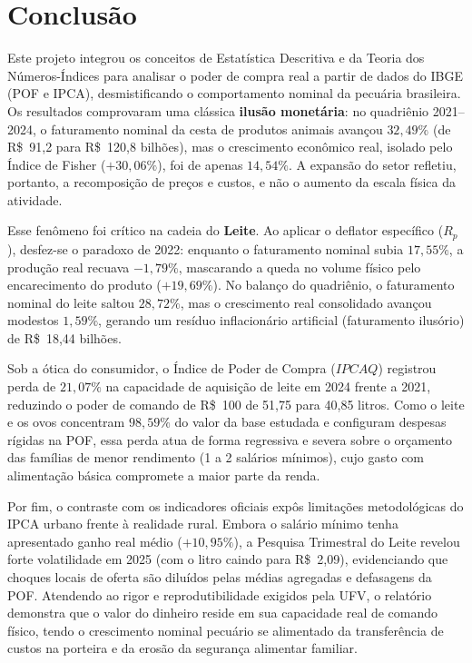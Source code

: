 \documentclass[12pt,a4paper]{article}
\begin{document}
\section*{Conclusão}

Este projeto integrou os conceitos de Estatística Descritiva e da Teoria dos Números-Índices para analisar o poder de compra real a partir de dados do IBGE (POF e IPCA), desmistificando o comportamento nominal da pecuária brasileira. Os resultados comprovaram uma clássica \textbf{ilusão monetária}: no quadriênio 2021--2024, o faturamento nominal da cesta de produtos animais avançou $32{,}49\%$ (de R\$~91,2 para R\$~120,8 bilhões), mas o crescimento econômico real, isolado pelo Índice de Fisher ($+30{,}06\%$), foi de apenas $14{,}54\%$. A expansão do setor refletiu, portanto, a recomposição de preços e custos, e não o aumento da escala física da atividade.

Esse fenômeno foi crítico na cadeia do \textbf{Leite}. Ao aplicar o deflator específico ($R_p$), desfez-se o paradoxo de 2022: enquanto o faturamento nominal subia $17{,}55\%$, a produção real recuava $-1{,}79\%$, mascarando a queda no volume físico pelo encarecimento do produto ($+19{,}69\%$). No balanço do quadriênio, o faturamento nominal do leite saltou $28{,}72\%$, mas o crescimento real consolidado avançou modestos $1{,}59\%$, gerando um resíduo inflacionário artificial (faturamento ilusório) de R\$~18,44 bilhões.

Sob a ótica do consumidor, o Índice de Poder de Compra ($IPCAQ$) registrou perda de $21{,}07\%$ na capacidade de aquisição de leite em 2024 frente a 2021, reduzindo o poder de comando de R\$~100 de 51,75 para 40,85 litros. Como o leite e os ovos concentram $98{,}59\%$ do valor da base estudada e configuram despesas rígidas na POF, essa perda atua de forma regressiva e severa sobre o orçamento das famílias de menor rendimento (1 a 2 salários mínimos), cujo gasto com alimentação básica compromete a maior parte da renda.

Por fim, o contraste com os indicadores oficiais expôs limitações metodológicas do IPCA urbano frente à realidade rural. Embora o salário mínimo tenha apresentado ganho real médio ($+10{,}95\%$), a Pesquisa Trimestral do Leite revelou forte volatilidade em 2025 (com o litro caindo para R\$~2,09), evidenciando que choques locais de oferta são diluídos pelas médias agregadas e defasagens da POF. Atendendo ao rigor e reprodutibilidade exigidos pela UFV, o relatório demonstra que o valor do dinheiro reside em sua capacidade real de comando físico, tendo o crescimento nominal pecuário se alimentado da transferência de custos na porteira e da erosão da segurança alimentar familiar.
\end{document}
